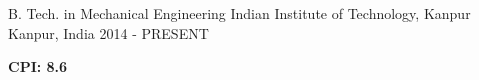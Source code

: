 

\begin{cventries}

  \cventry
    {B. Tech. in Mechanical Engineering} %
    {Indian Institute of Technology, Kanpur} %
    {Kanpur, India} %
    {2014 - PRESENT} %
    {
        \begin{cvitems}
            \item{\textbf{CPI: 8.6}}
        \end{cvitems}
    }




\end{cventries}
